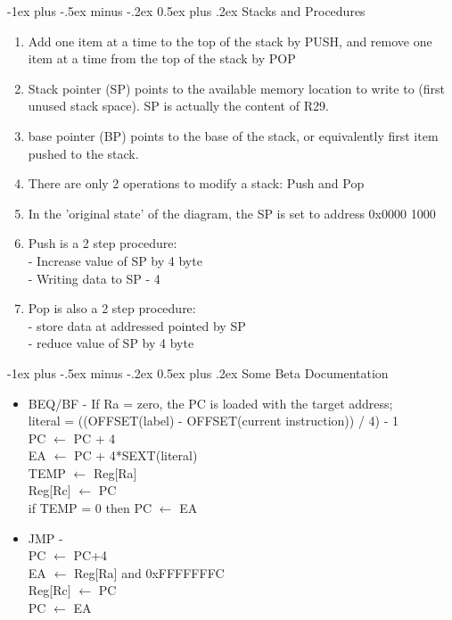 \documentclass[9pt,landscape]{extarticle}
\makeatletter
\renewcommand{\section}{\@startsection{section}{1}{0mm}%
                                {-1ex plus -.5ex minus -.2ex}%
                                {0.5ex plus .2ex}%
                                {\normalfont\large\bfseries}}
\makeatother
\begin{document}
\begin{multicols*}{5}
\section{Stacks and Procedures}
\begin{enumerate}
\item Add one item at a time to the top of the stack by PUSH, and remove one item at a time from the top of the stack by POP
\item Stack pointer (SP) points to the available memory location to write to (first unused stack space). SP is actually the content of R29.
\item base pointer (BP) points to the base of the stack, or equivalently first item pushed to the stack.
\item There are only 2 operations to modify a stack: Push and Pop
\item In the ’original state’ of the diagram, the SP is set to address 0x0000 1000
\item Push is a 2 step procedure: \\
- Increase value of SP by 4 byte \\
- Writing data to SP - 4
\item Pop is also a 2 step procedure: \\
- store data at addressed pointed by SP \\
- reduce value of SP by 4 byte
\end{enumerate}


\section{Some Beta Documentation}
\begin{itemize}
\item BEQ/BF - If Ra = zero, the PC is loaded with the target address; \\
literal = ((OFFSET(label) - OFFSET(current instruction)) / 4) - 1 \\
PC $\leftarrow$ PC + 4 \\
EA $\leftarrow$ PC + 4*SEXT(literal) \\
TEMP $\leftarrow$ Reg[Ra] \\
Reg[Rc] $\leftarrow$ PC \\
if TEMP = 0 then PC $\leftarrow$ EA \\
\item JMP - \\
PC $\leftarrow$ PC+4 \\
EA $\leftarrow$ Reg[Ra] and 0xFFFFFFFC \\
Reg[Rc] $\leftarrow$ PC \\
PC $\leftarrow$ EA \\


\end{itemize}
\end{multicols*}
\end{document}
